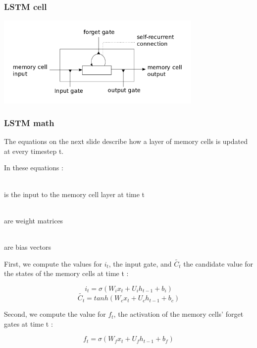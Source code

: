 \documentclass[utf8x,xcolor=pdftex,dvipsnames,table]{beamer}
\begin{document}
\begin{frame}
  \frametitle{LSTM cell}
\includegraphics[width=0.75\textwidth]{../images/lstm_memorycell.png}
\end{frame}

\begin{frame}[allowframebreaks]
  \frametitle{LSTM math}
The equations on the next slide describe how a layer of memory cells is updated at every timestep t.

In these equations :

\begin{description}[m]
\item[$x_t$] \hfill \\
is the input to the memory cell layer at time t
\item[$W_i$, $W_f$, $W_c$, $W_o$, $U_i$, $U_f$, $U_c$, $U_o$ and $V_o$] \hfill \\
 are weight matrices
\item[$b_i$, $b_f$, $b_c$ and $b_o$] \hfill \\
are bias vectors
\end{description}

\framebreak

First, we compute the values for $i_t$, the input gate, and $\widetilde{C_t}$ the candidate value for the states of the memory cells at time t :

\begin{equation}
i_t = \sigma(W_i x_t + U_i h_{t-1} + b_i)
\end{equation}
\begin{equation}
\widetilde{C_t} = tanh(W_c x_t + U_c h_{t-1} + b_c)
\end{equation}

Second, we compute the value for $f_t$, the activation of the memory cells’ forget gates at time t :

\begin{equation}
f_t = \sigma(W_f x_t + U_f h_{t-1} + b_f)
\end{equation}


\end{frame}
\end{document}
